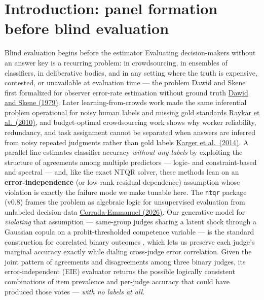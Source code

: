 \documentclass[
  ignorenonframetext,
]{beamer}
\author{\texorpdfstring{}{}}
\date{}
\begin{document}
\section{Introduction: panel formation before blind
evaluation}\label{introduction-panel-formation-before-blind-evaluation}

\begin{frame}{Blind evaluation begins before
the estimator}
\protect{}\label{blind-evaluation-begins-before-the-estimator}
Evaluating decision-makers without an answer key is a recurring problem:
in crowdsourcing, in ensembles of classifiers, in deliberative bodies,
and in any setting where the truth is expensive, contested, or
unavailable at evaluation time --- the problem Dawid and Skene first
formalized for observer error-rate estimation without ground truth
\href{https://doi.org/10.2307/2346806}{Dawid and Skene (1979)}. Later
learning-from-crowds work made the same inferential problem operational
for noisy human labels and missing gold standards
\href{https://jmlr.org/papers/v11/raykar10a.html}{Raykar et al.~(2010)},
and budget-optimal crowdsourcing work shows why worker reliability,
redundancy, and task assignment cannot be separated when answers are
inferred from noisy repeated judgments rather than gold labels
\href{https://doi.org/10.1287/opre.2013.1235}{Karger et al.~(2014)}. A
parallel line estimates classifier accuracy \emph{without any labels} by
exploiting the structure of agreements among multiple predictors ---
logic- and constraint-based \breakseq{[@platanios2014]} and spectral
\breakseq{[@parisi2014]} --- and, like the exact NTQR solver, these methods
lean on an \textbf{error-independence} (or low-rank residual-dependence)
assumption whose violation is exactly the failure mode we make tunable
here. The \texttt{ntqr} package (v0.8) frames the problem as algebraic
logic for unsupervised evaluation from unlabeled decision data
\href{https://pypi.org/project/ntqr/}{Corrada-Emmanuel (2026)}. Our
generative model for \emph{violating} that assumption --- same-group
judges sharing a latent shock through a Gaussian copula on a
probit-thresholded competence variable --- is the standard construction
for correlated binary outcomes , which
lets us preserve each judge's marginal accuracy exactly while dialing
cross-judge error correlation. Given the joint pattern of agreements and
disagreements among three binary judges, its error-independent (EIE)
evaluator returns the possible logically consistent combinations of item
prevalence and per-judge accuracy that could have produced those votes
--- \emph{with no labels at all}.


\end{frame}
\end{document}

